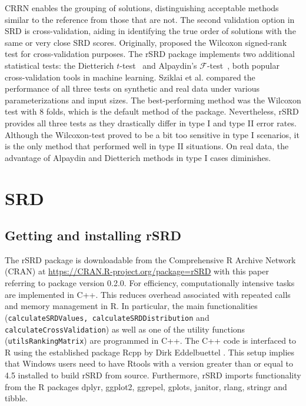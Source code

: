 CRRN enables the grouping of solutions, distinguishing acceptable methods similar to the reference from those that are not. The second validation option in SRD is cross-validation, aiding in identifying the true order of solutions with the same or very close SRD scores. Originally, \citet{KOLLARHUNEK2013139} proposed the Wilcoxon signed-rank test for cross-validation purposes. The rSRD package implements two additional statistical tests: the Dietterich ${\mathit{t}}$-test~\citep{dietterichApproximateStatisticalTests1998} and Alpaydin's $\mathcal{F}$-test~\citep{alpaydinCombinedCvTest1999}, both popular cross-validation tools in machine learning. Sziklai et al. \cite{Sziklai2024} compared the performance of all three tests on synthetic and real data under various parameterizations and input sizes. The best-performing method was the Wilcoxon test with 8 folds, which is the default method of the package. Nevertheless, rSRD provides all three tests as they drastically differ in type I and type II error rates. Although the Wilcoxon-test proved to be a bit
too sensitive in type I scenarios, it is the only method that performed well in
type II situations. On real data, the advantage of Alpaydin and Dietterich methods in type I cases diminishes.

\section{SRD} \label{sec:SRD}

\subsection{Getting and installing rSRD} \label{sec:SRD_inst}

The rSRD package is downloadable from the Comprehensive R Archive Network (CRAN) at \url{https://CRAN.R-project.org/package=rSRD} with this paper referring to package version 0.2.0. For efficiency, computationally intensive tasks are implemented in \textsf{C++}. This reduces overhead associated with repeated calls and memory management in \textsf{R}. In particular, the main functionalities (\texttt{calculateSRDValues, calculateSRDDistribution} and \texttt{calculateCrossValidation}) as well as one of the utility functions (\texttt{utilsRankingMatrix}) are programmed in  \textsf{C++}. The \textsf{C++} code is interfaced to R using the established package Rcpp by Dirk Eddelbuettel \citep{eddelbuettel2013seamless}. This setup implies that Windows users need to have Rtools with a version greater than or equal to 4.5 installed to build rSRD from source. Furthermore, rSRD imports functionality from the R packages dplyr, ggplot2, ggrepel, gplots, janitor, rlang, stringr and tibble.

